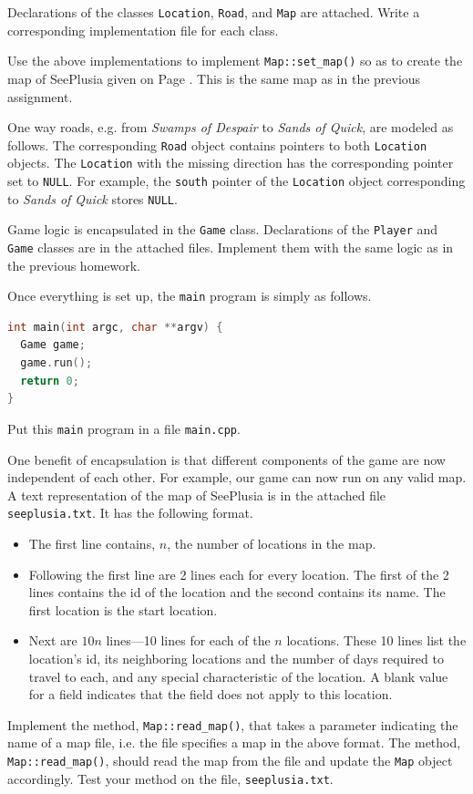 \documentclass[addpoints]{exam}
\begin{document}
\begin{questions}
  

Declarations of the classes {\tt Location}, {\tt Road}, and {\tt Map} are attached. Write a corresponding implementation file for each class.

Use the above implementations to implement {\tt Map::set\_map()} so as to create the map of SeePlusia given on Page \pageref{sec:map}. This is the same map as in the previous assignment.

One way roads, e.g. from {\it Swamps of Despair} to {\it Sands of Quick}, are modeled as follows. The corresponding {\tt Road} object contains pointers to both {\tt Location} objects. The {\tt Location} with the missing direction has the corresponding pointer set to {\tt NULL}. For example, the {\tt south} pointer of the {\tt Location} object corresponding to {\it Sands of Quick} stores {\tt NULL}.


Game logic is encapsulated in the {\tt Game} class. Declarations of the {\tt Player} and {\tt Game} classes are in the attached files. Implement them with the same logic as in the previous homework.

Once everything is set up, the {\tt main} program is simply as follows.
\begin{lstlisting}[frame=single,language=c++]
int main(int argc, char **argv) {
  Game game;
  game.run();
  return 0;
}
\end{lstlisting}
Put this {\tt main} program in a file {\tt main.cpp}.


One benefit of encapsulation is that different components of the game are now independent of each other. For example, our game can now run on any valid map. A text representation of the map of SeePlusia is in the attached file {\tt seeplusia.txt}. It has the following format.
\begin{itemize}
\item The first line contains, $n$, the number of locations in the map.
\item Following the first line are 2 lines each for every location. The first of the 2 lines contains the id of the location and the second contains its name. The first location is the start location.
\item Next are $10n$ lines---10 lines for each of the $n$ locations. These 10 lines list the location's id, its neighboring locations and the number of days required to travel to each, and any special characteristic of the location. A blank value for a field indicates that the field does not apply to this location.
\end{itemize}
Implement the method, {\tt Map::read\_map()}, that takes a parameter indicating the name of a map file, i.e. the file specifies a map in the above format. The method, {\tt Map::read\_map()}, should read the map from the file and update the {\tt Map} object accordingly. Test your method on the file, {\tt seeplusia.txt}.


\end{questions}
\end{document}
